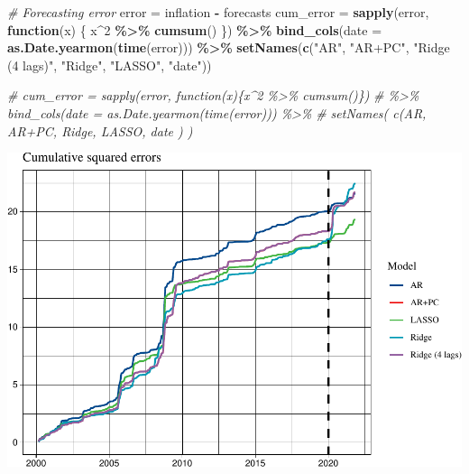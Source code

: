 \documentclass[
]{article}
\newenvironment{Shaded}{\begin{snugshade}}{\end{snugshade}}
\newcommand{\AttributeTok}[1]{\textcolor[rgb]{0.13,0.29,0.53}{#1}}
\newcommand{\CommentTok}[1]{\textcolor[rgb]{0.56,0.35,0.01}{\textit{#1}}}
\newcommand{\ControlFlowTok}[1]{\textcolor[rgb]{0.13,0.29,0.53}{\textbf{#1}}}
\newcommand{\DecValTok}[1]{\textcolor[rgb]{0.00,0.00,0.81}{#1}}
\newcommand{\FunctionTok}[1]{\textcolor[rgb]{0.13,0.29,0.53}{\textbf{#1}}}
\newcommand{\NormalTok}[1]{#1}
\newcommand{\OtherTok}[1]{\textcolor[rgb]{0.56,0.35,0.01}{#1}}
\newcommand{\SpecialCharTok}[1]{\textcolor[rgb]{0.81,0.36,0.00}{\textbf{#1}}}
\newcommand{\StringTok}[1]{\textcolor[rgb]{0.31,0.60,0.02}{#1}}
\begin{document}
\begin{Shaded}
\begin{Highlighting}[]
\CommentTok{\# Forecasting error}
\NormalTok{error }\OtherTok{=}\NormalTok{ inflation }\SpecialCharTok{{-}}\NormalTok{ forecasts}
\NormalTok{cum\_error }\OtherTok{=} \FunctionTok{sapply}\NormalTok{(error, }\ControlFlowTok{function}\NormalTok{(x) \{}
\NormalTok{    x}\SpecialCharTok{\^{}}\DecValTok{2} \SpecialCharTok{\%\textgreater{}\%}
        \FunctionTok{cumsum}\NormalTok{()}
\NormalTok{\}) }\SpecialCharTok{\%\textgreater{}\%}
    \FunctionTok{bind\_cols}\NormalTok{(}\AttributeTok{date =} \FunctionTok{as.Date.yearmon}\NormalTok{(}\FunctionTok{time}\NormalTok{(error))) }\SpecialCharTok{\%\textgreater{}\%}
    \FunctionTok{setNames}\NormalTok{(}\FunctionTok{c}\NormalTok{(}\StringTok{"AR"}\NormalTok{, }\StringTok{"AR+PC"}\NormalTok{, }\StringTok{"Ridge (4 lags)"}\NormalTok{, }\StringTok{"Ridge"}\NormalTok{, }\StringTok{"LASSO"}\NormalTok{,}
        \StringTok{"date"}\NormalTok{))}


\CommentTok{\# cum\_error = sapply(error, function(x)\{x\^{}2 \%\textgreater{}\% cumsum()\})}
\CommentTok{\# \%\textgreater{}\% bind\_cols(date = as.Date.yearmon(time(error))) \%\textgreater{}\%}
\CommentTok{\# setNames( c(\textquotesingle{}AR\textquotesingle{}, \textquotesingle{}AR+PC\textquotesingle{}, \textquotesingle{}Ridge\textquotesingle{}, \textquotesingle{}LASSO\textquotesingle{}, \textquotesingle{}date\textquotesingle{} ) )}
\end{Highlighting}
\end{Shaded}

\includegraphics{Trabalho_Econo4_Q2_files/figure-latex/unnamed-chunk-26-1.pdf}
\end{document}
